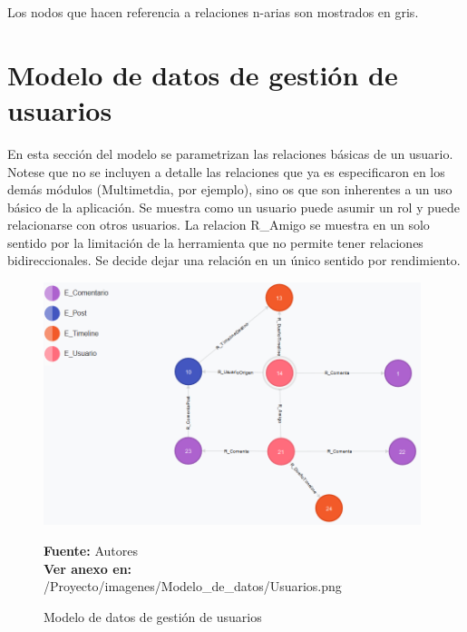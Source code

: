 Los nodos que hacen referencia a relaciones n-arias son mostrados en gris.

\section{Modelo de datos de gestión de usuarios}

En esta sección del modelo se parametrizan las relaciones básicas de un usuario. Notese que no se incluyen a detalle las relaciones que ya es especificaron en los demás módulos (Multimetdia, por ejemplo), sino os que son inherentes a un uso básico de la aplicación. Se muestra como un usuario puede asumir un rol y puede relacionarse con otros usuarios. La relacion R\_Amigo se muestra en un solo sentido por la limitación de la herramienta que no permite tener relaciones bidireccionales. Se decide dejar una relación en un único sentido por rendimiento.
\begin{figure}[!htb]
  \begin{center}
    \includegraphics[width=11cm]{./imagenes/Modelo_de_datos/Usuarios.png}
    \caption{Modelo de datos de gestión de usuarios}
    \label{fig:modelo_datos_gestion_usuarios}
    \textbf{Fuente:}  Autores \\
    \textbf{Ver anexo en:} /Proyecto/imagenes/Modelo\_de\_datos/Usuarios.png
  \end{center}
\end{figure}
